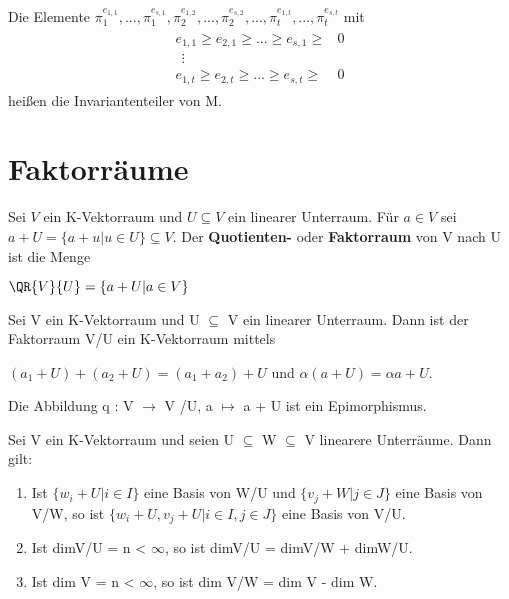 \begin{definition}
Die Elemente $\pi_1^{e_{1,1}},...,\pi_1^{e_{s,1}},\pi_2^{e_{1,2}},...,\pi_2^{e_{s,2}},...,\pi_t^{e_{1,t}},...,\pi_t^{e_{s,t}}$ mit 
\begin{align*}
\begin{array}{ll}
e_{1,1} \geq e_{2,1} \geq ... \geq e_{s,1} \geq & 0 \\ 
~~\vdots & \\ 
e_{1,t} \geq e_{2,t} \geq ... \geq e_{s,t} \geq & 0
\end{array} 
\end{align*}
heißen die Invariantenteiler von M.
\end{definition}

\section{Faktorräume}
\begin{definition}
Sei $V$ ein K-Vektorraum und $U \subseteq V$ ein linearer Unterraum. Für $a \in V$ sei $a + U = \{a + u | u \in U\} \subseteq V$. Der \textbf{Quotienten-} oder \textbf{Faktorraum} von V nach U ist die Menge 
\begin{center}
$\QR{V}{U} = \{a + U | a \in V\}$
\end{center}
\end{definition}

\begin{lemma}
Sei V ein K-Vektorraum und U $\subseteq$ V ein linearer Unterraum. Dann ist der Faktorraum V/U ein K-Vektorraum mittels
\begin{center}
$(a_1 + U)+(a_2 + U)=(a_1 +a_2)+U$ und $\alpha(a+U)=\alpha a+U$.
\end{center} 
Die Abbildung q : V $\to$ V /U, a $\mapsto$ a + U ist ein Epimorphismus.
\end{lemma}

\begin{lemma}
Sei V ein K-Vektorraum und seien U $\subseteq$ W $\subseteq$ V linearere Unterräume. Dann gilt:
\begin{enumerate}
\item Ist $\{w_i + U | i \in I\}$ eine Basis von W/U und $\{v_j + W | j \in J\}$ eine Basis von V/W, so ist $\{w_i +U, v_j +U | i \in I, j \in J\}$ eine Basis von V/U.
\item Ist dimV/U = n < $\infty$, so ist dimV/U = dimV/W + dimW/U.
\item Ist dim V = n < $\infty$, so ist dim V/W = dim V - dim W.
\end{enumerate}
\end{lemma}

